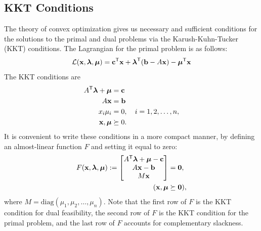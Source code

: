 \subsection*{KKT Conditions}

The theory of convex optimization gives us necessary and sufficient conditions for the solutions to the primal and dual problems via the Karush-Kuhn-Tucker (KKT) conditions.
The Lagrangian for the primal problem is as follows:
\[
\mathcal{L}(\mathbf{x}, \boldsymbol{\lambda}, \boldsymbol{\mu})
= \mathbf{c}^{\mathsf T} \mathbf{x} + \boldsymbol{\lambda}^{\mathsf T} (\mathbf{b} - A\mathbf{x}) - \boldsymbol{\mu}^{\mathsf T} \mathbf{x}
\]
The KKT conditions are
\begin{align*}
A^{\mathsf T} \boldsymbol{\lambda} + \boldsymbol{\mu} &= \mathbf{c}\\
A\mathbf{x} &= \mathbf{b}\\
x_i\mu_i &= 0, \quad i = 1,2,\ldots,n,\\
\mathbf{x}, \boldsymbol{\mu} &\succeq 0.
\end{align*}
It is convenient to write these conditions in a more compact manner, by defining an almost-linear function $F$ and setting it equal to zero:
\begin{align*}
F(\mathbf{x},\boldsymbol{\lambda},\boldsymbol{\mu}) :=
\begin{bmatrix}
A^{\mathsf T} \boldsymbol{\lambda} + \boldsymbol{\mu} - \mathbf{c}\\
A\mathbf{x} - \mathbf{b}\\
M\mathbf{x}\\
\end{bmatrix}
&= \mathbf{0},\\
(\mathbf{x},\boldsymbol{\mu} &\succeq \mathbf{0}),
\end{align*}
where $M = \text{diag}(\mu_1,\mu_2,\ldots,\mu_n)$.
Note that the first row of $F$ is the KKT condition for dual feasibility, the second row of $F$ is the KKT condition for the primal problem, and the last row of $F$ accounts for complementary slackness.

